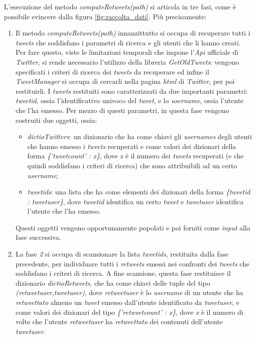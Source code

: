 L'esecuzione del metodo \textit{computeRetweets(path)} si articola in tre fasi, come è possibile evincere dalla figura \ref{fig:raccolta_dati}. Più precisamente:
\begin{enumerate}
\item Il metodo \textit{computeRetweets(path)} innanzittutto si occupa di recuperare tutti i \textit{tweets} che soddisfano i parametri di ricerca e gli utenti che li hanno creati. Per fare questo, viste le limitazioni temporali che impone l'\textit{Api} ufficiale di \textit{Twitter}, si rende necessario l'utilizzo della libreria \textit{GetOldTweets}: vengono specificati i criteri di ricerca dei \textit{tweets} da recuperare ed infine il \textit{TweetManager} si occupa di cercarli nella pagina \textit{html} di \textit{Twitter}, per poi restituirli. I \textit{tweets} restituiti sono caratterizzati da due importanti parametri: \textit{tweetid}, ossia l'identificativo univoco del \textit{tweet}, e lo \textit{username}, ossia l'utente che l'ha emesso. Per mezzo di questi parametri, in questa fase vengono costruiti due oggetti, ossia:
\begin{itemize}
\item \textit{dictioTwitters}: un dizionario che ha come chiavi gli \textit{usernames} degli utenti che hanno emesso i \textit{tweets} recuperati e come valori dei dizionari della forma \textit{\{'tweetcount' : x\}}, dove \textit{x} è il numero dei \textit{tweets} recuperati (e che quindi soddisfano i criteri di ricerca) che sono attribuibili ad un certo \textit{username};
\item \textit{tweetids}: una lista che ha come elementi dei dizionari della forma \textit{\{tweetid : tweetuser\}}, dove \textit{tweetid} identifica un certo \textit{tweet} e \textit{tweetuser} identifica l'utente che l'ha emesso.
\end{itemize}
Questi oggetti vengono opportunamente popolati e poi forniti come \textit{input} alla fase successiva.
\item La fase \textit{2} si occupa di scansionare la lista \textit{tweetids}, restituita dalla fase precedente, per individuare tutti i \textit{retweets} emessi nei confronti dei \textit{tweets} che soddisfano i criteri di ricerca. A fine scansione, questa fase restituisce il dizionario \textit{dictioRetweets}, che ha come chiavi delle tuple del tipo \textit{(retweetuser,tweetuser)}, dove \textit{retweetuser} è lo \textit{username} di un utente che ha \textit{retweettato} almeno un \textit{tweet} emesso dall'utente identificato da \textit{tweetuser}, e come valori dei dizionari del tipo \textit{\{'retweetcount' : x\}}, dove \textit{x} è il numero di volte che l'utente \textit{retweetuser} ha \textit{retweettato} dei contenuti dell'utente \textit{tweetuser}. 

\end{enumerate}
